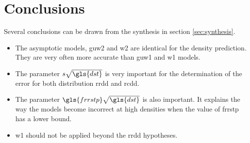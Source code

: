 \section{Conclusions}

Several conclusions can be drawn from the synthesis in section \ref{sec:synthesis}.

\begin{itemize}
\item The asymptotic models, \gls{guw2} and \gls{w2} are identical for the density prediction. They are very often more accurate than \gls{guw1} and \gls{w1} models.
\item The parameter \( s \sqrt{\gls{dst}} \) is very important for the determination of the error for both distribution \gls{rrdd} and \gls{rcdd}.
\item The parameter \( \gls{frrstp} \sqrt{\gls{dst}} \) is also important. It explains the way the models become incorrect at high densities when the value of \gls{frrstp} has a lower bound.
\item \gls{w1} should not be applied beyond the \gls{rrdd} hypotheses.
\end{itemize}
